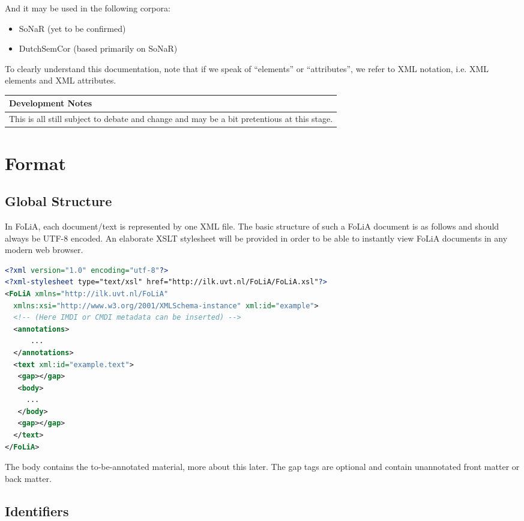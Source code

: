 \documentclass[a4paper,12pt]{report}
\newenvironment{devnotes}
{
\begin{center}
    \begin{tabular}[h!]{|p{0.8\textwidth}|}
    \hline
    {\bf Development Notes}\\\hline}
{   \\\hline
    \end{tabular}
\end{center}}
\begin{document}
And it may be used in the following corpora:

\begin{itemize} 
\item SoNaR (yet to be confirmed)
\item DutchSemCor (based primarily on SoNaR)
\end{itemize}

To clearly understand this documentation, note that if we speak of ``elements'' or ``attributes'', we refer to XML notation, i.e. XML elements and XML attributes.

\begin{devnotes}
This is all still subject to debate and change and may be a bit pretentious at this stage.
\end{devnotes}

\chapter{Format}

\section{Global Structure}

In FoLiA, each document/text is represented by one XML file. The basic structure of such a FoLiA document is as follows and should always be UTF-8 encoded. An elaborate XSLT stylesheet will be provided in order to be able to instantly view FoLiA documents in any modern web browser.

\begin{lstlisting}[language=xml]
<?xml version="1.0" encoding="utf-8"?>
<?xml-stylesheet type="text/xsl" href="http://ilk.uvt.nl/FoLiA/FoLiA.xsl"?>
<FoLiA xmlns="http://ilk.uvt.nl/FoLiA"
  xmlns:xsi="http://www.w3.org/2001/XMLSchema-instance" xml:id="example">
  <!-- (Here IMDI or CMDI metadata can be inserted) -->
  <annotations>
      ...
  </annotations>    
  <text xml:id="example.text">
   <gap></gap>
   <body>
     ...
   </body>
   <gap></gap>
  </text>
</FoLiA>  
\end{lstlisting}

The body contains the to-be-annotated material, more about this later. The gap tags are optional and contain unannotated front matter or back matter. \cite{DCOI}

\section{Identifiers}
\end{document}
